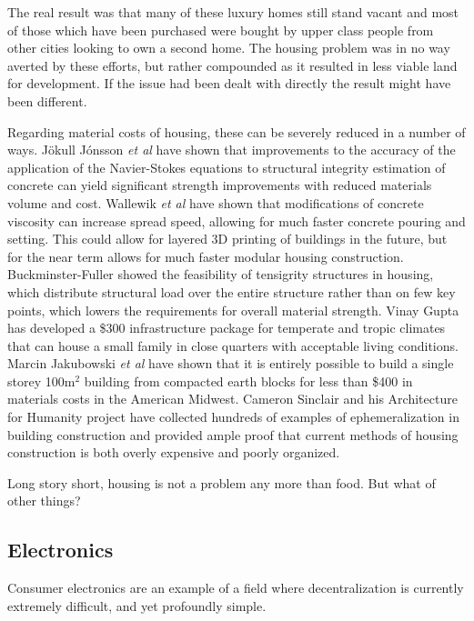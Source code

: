 The real result was that many of these luxury homes still stand vacant and most
of those which have been purchased were bought by upper class people from other
cities looking to own a second home. The housing problem was in no way averted
by these ef\hbox{}forts, but rather compounded as it resulted in less viable
land for development. If the issue had been dealt with directly the result 
might have been dif\hbox{}ferent.

Regarding material costs of housing, these can be severely reduced in a number
of ways. Jökull Jónsson \textit{et al} have shown that improvements to the
accuracy of the application of the Navier-Stokes  equations to structural
integrity estimation of concrete can yield signif\hbox{}icant strength
improvements with reduced materials volume and cost. Wallewik \textit{et al}
have shown that modif\hbox{}ications of concrete viscosity can increase spread
speed, allowing for much faster concrete pouring and setting. This could allow
for layered 3D printing of buildings in the future, but for the near term 
allows for much faster modular housing construction. Buckminster-Fuller showed
the feasibility of tensigrity structures in housing, which distribute 
structural load over the entire structure rather than on few key points, which
lowers the requirements for overall material strength. Vinay Gupta has 
developed a \$300 infrastructure package for temperate and tropic climates that
can house a small family in close quarters with acceptable living conditions.
Marcin Jakubowski \textit{et al} have shown that it is entirely possible to
build a single storey 100m$^2$ building from compacted earth blocks for less
than \$400 in materials costs in the American Midwest. Cameron Sinclair and his
Architecture for Humanity project have collected hundreds of examples of
ephemeralization in building construction and provided ample proof that current
methods of housing construction is both overly expensive and poorly organized.

Long story short, housing is not a problem any more than food. But what of 
other things? 


\subsection{Electronics}
\label{s:artificial_scarcity:burning_bridges:electronics}

Consumer electronics are an example of a f\hbox{}ield where decentralization is
currently extremely dif\hbox{}f\hbox{}icult, and yet profoundly simple.

